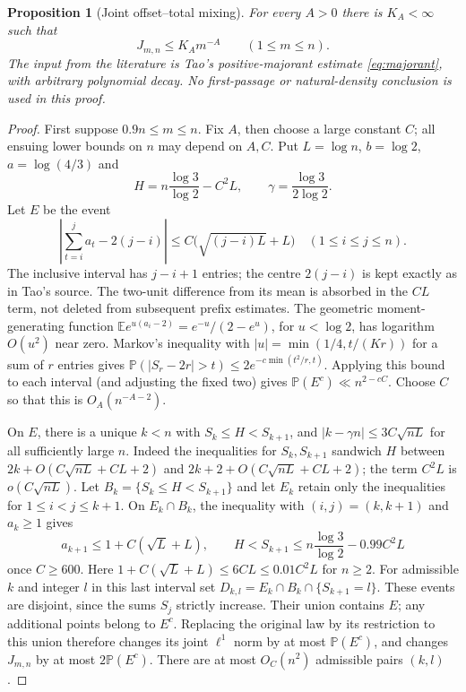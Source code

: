 \documentclass[11pt]{article}
\newtheorem{proposition}{Proposition}
\theoremstyle{remark}\newtheorem{remark}[proposition]{Remark}
\newcommand{\PP}{\mathbb P}
\newcommand{\EE}{\mathbb E}
\begin{document}
\begin{proposition}[Joint offset--total mixing]\label{prop:joint-mixing}
For every $A>0$ there is $K_A<\infty$ such that
\begin{equation}\label{eq:joint-mixing}
 J_{m,n}\le K_A m^{-A}\qquad(1\le m\le n).
\end{equation}
The input from the literature is Tao's positive-majorant estimate
\eqref{eq:majorant}, with arbitrary polynomial decay. No first-passage
or natural-density conclusion is used in this proof.
\end{proposition}
\begin{proof}
First suppose $0.9n\le m\le n$. Fix $A$, then choose a large constant
$C$; all ensuing lower bounds on $n$ may depend on $A,C$. Put
$L=\log n$, $b=\log2$, $a=\log(4/3)$ and
\[
 H=n\frac{\log3}{\log2}-C^2L,\qquad
 \gamma=\frac{\log3}{2\log2}.
\]
Let $E$ be the event
\[
 \left|\sum_{t=i}^j a_t-2(j-i)\right|
 \le C\big(\sqrt{(j-i)L}+L\big)
 \quad(1\le i\le j\le n).
\]
The inclusive interval has $j-i+1$ entries; the centre $2(j-i)$ is kept
exactly as in Tao's source. The two-unit difference from its mean is
absorbed in the $CL$ term, not deleted from subsequent prefix estimates.
The geometric moment-generating function
$\EE e^{u(a_i-2)}=e^{-u}/(2-e^u)$, for $u<\log2$, has logarithm
$O(u^2)$ near zero. Markov's inequality with
$|u|=\min(1/4,t/(K r))$ for a sum of $r$ entries gives
$\PP(|S_r-2r|>t)\le2e^{-c\min(t^2/r,t)}$.
Applying this bound to each interval (and adjusting the fixed two)
gives $\PP(E^c)\ll n^{2-cC}$. Choose $C$ so that this is
$O_A(n^{-A-2})$.

On $E$, there is a unique $k<n$ with $S_k\le H<S_{k+1}$, and
$|k-\gamma n|\le3C\sqrt{nL}$ for all sufficiently large $n$.
Indeed the inequalities for $S_k,S_{k+1}$ sandwich $H$ between
$2k+O(C\sqrt{nL}+CL+2)$ and
$2k+2+O(C\sqrt{nL}+CL+2)$; the term $C^2L$ is
$o(C\sqrt{nL})$. Let $B_k=\{S_k\le H<S_{k+1}\}$ and let $E_k$
retain only the inequalities for $1\le i<j\le k+1$. On $E_k\cap B_k$,
the inequality with $(i,j)=(k,k+1)$ and $a_k\ge1$ gives
\[
 a_{k+1}\le1+C(\sqrt L+L),\qquad
 H<S_{k+1}\le n\frac{\log3}{\log2}-0.99C^2L
\]
once $C\ge600$. Here $1+C(\sqrt L+L)\le6CL\le0.01C^2L$
for $n\ge2$. For admissible $k$ and integer $l$ in this last interval
set $D_{k,l}=E_k\cap B_k\cap\{S_{k+1}=l\}$. These events are
disjoint, since the sums $S_j$ strictly increase. Their union contains
$E$; any additional points belong to $E^c$. Replacing the original law
by its restriction to this union therefore changes its joint
$\ell^1$ norm by at most $\PP(E^c)$, and changes $J_{m,n}$ by at most
$2\PP(E^c)$. There are at most $O_C(n^2)$ admissible pairs $(k,l)$.


\end{proof}
\end{document}
